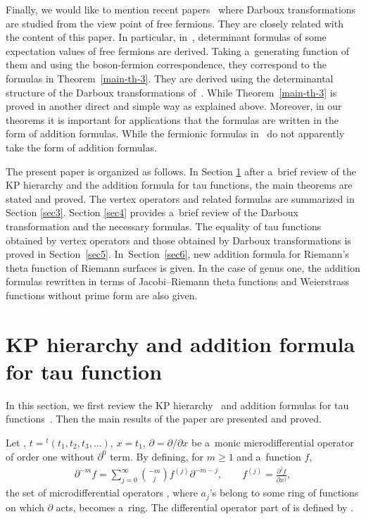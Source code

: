\documentclass[pdftex]{sigma}
\numberwithin{equation}{section}
\theoremstyle{definition}
\begin{document}
 Finally, we would like to mention recent papers~\cite{Wang-Chen-Cheng2025,Zabrodin2025}
 where Darboux transformations are studied from the view point of free fermions.
They are closely related with the content of this paper.
 In particular, in~\cite{Wang-Chen-Cheng2025}, determinant formulas of some expectation values of free fermions are derived. Taking a~generating function of them and using the boson-fermion correspondence, they correspond to the formulas in Theorem~\ref{main-th-3}.
 They are derived using the determinantal structure of the Darboux transformations of~\cite{He-Li-Cheng2002}.
While Theorem~\ref{main-th-3} is proved in another direct and simple way as explained above.
Moreover, in our theorems it is important for applications that the formulas are
written in the form of addition formulas. While the fermionic formulas
 in~\cite{Wang-Chen-Cheng2025} do not apparently take the form of addition formulas.



The present paper is organized as follows.
In Section \ref{sec2} after a~brief review of the KP hierarchy and the addition formula
for tau functions, the main theorems are stated and proved.
The vertex operators and related formulas are summarized in Section \ref{sec3}.
Section \ref{sec4} provides a~brief review of the Darboux transformation and the necessary formulas.
The equality of tau functions obtained by vertex operators and those obtained by Darboux transformations is proved in Section~\ref{sec5}.
In~Section~\ref{sec6}, new addition formula for Riemann's theta function of Riemann surfaces
is given. In the case of genus one, the addition formulas rewritten in terms of Jacobi--Riemann theta functions and Weierstrass functions without prime form are also given.




\section{KP hierarchy and addition formula for tau function}\label{sec2}
In this section, we first review the KP hierarchy~\cite{DJKM, Sato1981, SS} and addition formulas for
tau functions~\cite{SS,Shigyo2013}.
Then the main results of the paper are presented and proved.

Let
,
$
t={}^t(t_1,t_2,t_3,\dots )$,
$
x=t_1$,
$
\partial=\partial/\partial x
$
be a~monic microdifferential operator of order one without $\partial^0$ term.
By defining, for $m\geq 1$ and a~function $f$,
\begin{gather*}
\partial^{-m}f=\sum_{j=0}^\infty \binom{-m}{j}f^{(j)}\partial^{-m-j},
\qquad
f^{(j)}=\frac{\partial^j f}{\partial x^j},
\end{gather*}
the set of microdifferential operators ,
where $a_j$'s belong to some ring of functions on which $\partial$ acts, becomes a~ring.
The differential operator part of  is defined by
.
\end{document}
